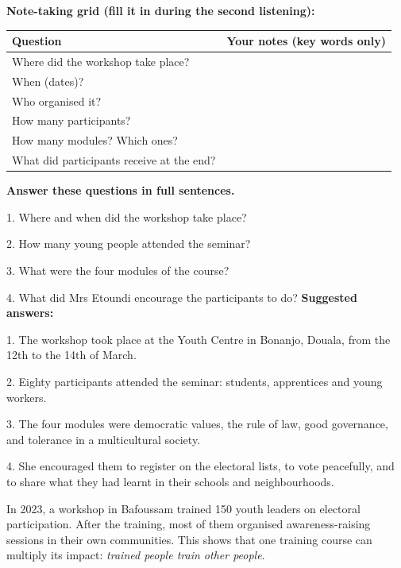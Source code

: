 \documentclass[11pt]{article}
\begin{document}
\textbf{Note-taking grid (fill it in during the second listening):}

\begin{center}
\begin{tabularx}{\linewidth}{|l|X|}\hline
\rowcolor{popblueL} \textbf{Question} & \textbf{Your notes (key words only)} \\ \hline
Where did the workshop take place? & \\ \hline
When (dates)? & \\ \hline
Who organised it? & \\ \hline
How many participants? & \\ \hline
How many modules? Which ones? & \\ \hline
What did participants receive at the end? & \\ \hline
\end{tabularx}
\end{center}

\begin{exoresolu}
\textbf{Answer these questions in full sentences.}\par
1. Where and when did the workshop take place?\par
2. How many young people attended the seminar?\par
3. What were the four modules of the course?\par
4. What did Mrs Etoundi encourage the participants to do?
\tcblower
\textbf{Suggested answers:}\par
1. The workshop took place at the Youth Centre in Bonanjo, Douala, from the 12th to the 14th of March.\par
2. Eighty participants attended the seminar: students, apprentices and young workers.\par
3. The four modules were democratic values, the rule of law, good governance, and tolerance in a multicultural society.\par
4. She encouraged them to register on the electoral lists, to vote peacefully, and to share what they had learnt in their schools and neighbourhoods.
\end{exoresolu}

\begin{exemplebox}
In 2023, a workshop in Bafoussam trained 150 youth leaders on electoral participation. After the training, most of them organised awareness-raising sessions in their own communities. This shows that one training course can multiply its impact: \emph{trained people train other people}.
\end{exemplebox}
\end{document}
